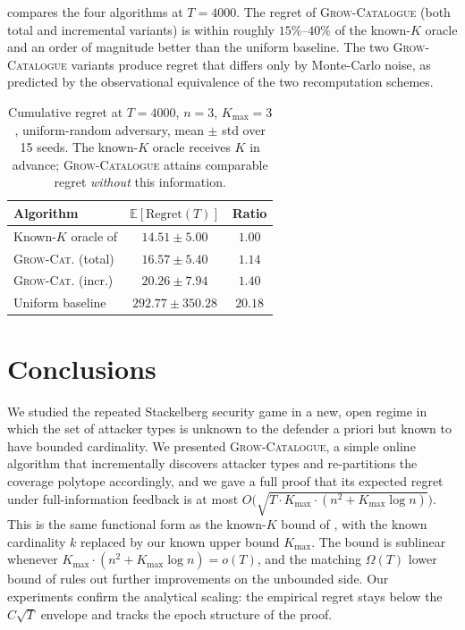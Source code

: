 \documentclass[letterpaper,9pt,twocolumn]{extarticle}
\newcommand{\EE}{\mathbb{E}}
\newcommand{\Kmax}{K_{\max}}
\newcommand{\Regret}{\mathrm{Regret}}
\theoremstyle{plain}
\theoremstyle{definition}
\theoremstyle{remark}
\begin{document}
 compares the four algorithms at $T=4000$. The regret
of \textsc{Grow-Catalogue} (both total and incremental variants) is
within roughly $15\%$--$40\%$ of the known-$K$ oracle and an order of
magnitude better than the uniform baseline. The two \textsc{Grow-Catalogue}
variants produce regret that differs only by Monte-Carlo noise, as
predicted by the observational equivalence of the two recomputation
schemes.

\begin{table}[h]
\centering
\footnotesize
\renewcommand{\arraystretch}{1.15}
\begin{tabular}{lcc}
\toprule
Algorithm & $\EE[\Regret(T)]$ & Ratio\\
\midrule
Known-$K$ oracle of \citet{balcan2015} & $14.51\pm 5.00$  & $1.00$\\
\textsc{Grow-Cat.} (total)     & $16.57\pm 5.40$  & $1.14$\\
\textsc{Grow-Cat.} (incr.)     & $20.26\pm 7.94$  & $1.40$\\
Uniform baseline               & $292.77\pm 350.28$ & $20.18$\\
\bottomrule
\end{tabular}
\caption{Cumulative regret at $T=4000$, $n=3$, $\Kmax=3$, uniform-random
adversary, mean $\pm$ std over 15 seeds. The known-$K$ oracle receives
$K$ in advance; \textsc{Grow-Catalogue} attains comparable regret
\emph{without} this information.}
\label{tab:comparison}
\end{table}

\section{Conclusions}
\label{sec:conc}

We studied the repeated Stackelberg security game in a new, open regime
in which the set of attacker types is unknown to the defender a priori
but known to have bounded cardinality. We presented \textsc{Grow-Catalogue},
a simple online algorithm that incrementally discovers attacker types and
re-partitions the coverage polytope accordingly, and we gave a full proof
that its expected regret under full-information feedback is at most
$O\!\bigl(\sqrt{T\cdot\Kmax\cdot(n^2+\Kmax\log n)}\bigr)$. This is the
same functional form as the known-$K$ bound of \citet[Theorem 5.1]{balcan2015},
with the known cardinality $k$ replaced by our known upper bound $\Kmax$.
The bound is sublinear whenever $\Kmax\cdot(n^2+\Kmax\log n)=o(T)$, and
the matching $\Omega(T)$ lower bound of \citet[Theorem 7.1]{balcan2015}
rules out further improvements on the unbounded side. Our experiments
confirm the analytical scaling: the empirical regret stays below the
$C\sqrt T$ envelope and tracks the epoch structure of the proof.
\end{document}
